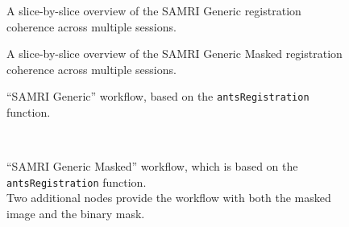 \begin{figure*}[h!]
    \centering
    \begin{subfigure}[t]{1\textwidth}
        \centering
        \setlength{\fboxsep}{0pt}%
        \setlength{\fboxrule}{0.2pt}%
        \caption{A slice-by-slice overview of the SAMRI Generic registration coherence across multiple sessions.}
    \end{subfigure}
\end{figure*}
\begin{figure*}[h!]
    \ContinuedFloat
    \begin{subfigure}[t]{1\textwidth}
        \centering
        \setlength{\fboxsep}{0pt}%
        \setlength{\fboxrule}{0.2pt}%
        \caption{A slice-by-slice overview of the SAMRI Generic Masked registration coherence across multiple sessions.}
    \end{subfigure}
    \caption{
    \textbf{Both the SAMRI Generic and the Generic Masked workflow present a consistent mapping across sessions.}
    }
    \label{fig:coherence}
\end{figure*}

\begin{figure*}[h!]
    \begin{subfigure}{0.60\textwidth}
        \centering
        \vspace{-1.9em}
        \caption{
        “SAMRI Generic” workflow, based on the \textcolor{mg}{\texttt{antsRegistration}} function.
        }
        \label{fig:nwfgg}
    \end{subfigure}
    \\
    \begin{subfigure}{0.60\linewidth}
        \centering
        \vspace{-1.9em}
        \caption{
        “SAMRI Generic Masked” workflow, which is based on the \textcolor{mg}{\texttt{antsRegistration}} function.\\
        Two additional nodes provide the workflow with both the masked image and the binary mask.
        }
        \label{fig:nwfgl}
    \end{subfigure}\hfill
    \caption{
    Directed acyclic graphs visualising the two registration workflows.
    Each node name is depicted together with its corresponding package name in paranthesis.
    The “utility” indication corresponds to nodes based on Python functions specific to the workflow, distributed alongside it, and dynamically wrapped via Nipype.
    }
    \label{fig:nwfg}
\end{figure*}

